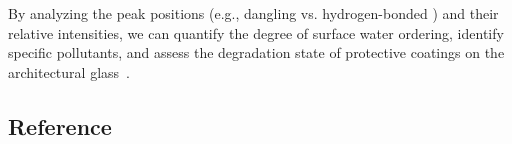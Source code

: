 By analyzing the peak positions (e.g., dangling  vs.
hydrogen-bonded ) and their relative intensities, we can quantify the
degree of surface water ordering, identify specific pollutants, and assess the
degradation state of protective coatings on the architectural
glass~\cite{jubb2012environmental}.

\subsection*{Reference}

  \renewcommand \addcontentsline [3] {}
  \renewcommand \chapter [2] {}
  \printbibliography

\endgroup
